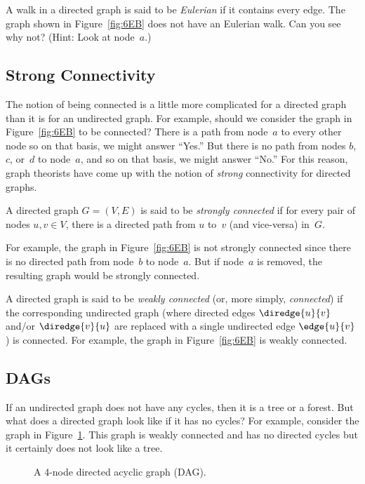 A walk in a directed graph is said to be \emph{Eulerian} if it
contains every edge.  The graph shown in Figure~\ref{fig:6EB} does not
have an Eulerian walk.  Can you see why not?  (Hint: Look at
node~$a$.)

\subsection{Strong Connectivity}

The notion of being connected is a little more complicated for a
directed graph than it is for an undirected graph.  For example,
should we consider the graph in Figure~\ref{fig:6EB} to be connected?
There is a path from node~$a$ to every other node so on that basis, we
might answer ``Yes.''  But there is no path from nodes $b$, $c$,
or~$d$ to node~$a$, and so on that basis, we might answer ``No.''  For
this reason, graph theorists have come up with the notion of
\emph{strong} connectivity for directed graphs.

\begin{definition}
A directed graph $G = (V, E)$ is said to be \emph{strongly connected}
if for every pair of nodes $u, v \in V$, there is a directed path from
$u$ to~$v$ (and vice-versa) in~$G$.
\end{definition}

For example, the graph in Figure~\ref{fig:6EB} is not strongly
connected since there is no directed path from node~$b$ to node~$a$.
But if node~$a$ is removed, the resulting graph would be strongly
connected.

A directed graph is said to be \emph{weakly connected} (or, more
simply, \emph{connected}) if the corresponding undirected graph (where
directed edges $\diredge{u}{v}$ and/or $\diredge{v}{u}$ are replaced
with a single undirected edge $\edge{u}{v}$) is connected.  For example,
the graph in Figure~\ref{fig:6EB} is weakly connected.

\subsection{DAGs}

If an undirected graph does not have any cycles, then it is a tree or
a forest.  But what does a directed graph look like if it has no
cycles?  For example, consider the graph in Figure~\ref{fig:6ED}.
This graph is weakly connected and has no directed cycles but it
certainly does not look like a tree.

\begin{figure}

\missinggraphic

\caption{A 4-node directed acyclic graph (DAG).}

\label{fig:6ED}

\end{figure}

